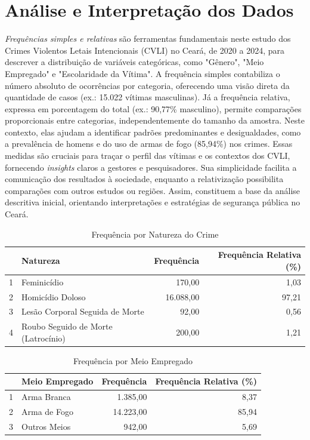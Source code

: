 \documentclass{exam}
\begin{document}
\section{Análise e Interpretação dos Dados}
\begin{questions}

\question 
\textit{Frequências simples e relativas} são ferramentas fundamentais neste estudo dos Crimes Violentos Letais Intencionais (CVLI) no Ceará, de 2020 a 2024, para descrever a distribuição de variáveis categóricas, como "Gênero", "Meio Empregado" e "Escolaridade da Vítima". A frequência simples contabiliza o número absoluto de ocorrências por categoria, oferecendo uma visão direta da quantidade de casos (ex.: 15.022 vítimas masculinas). Já a frequência relativa, expressa em porcentagem do total (ex.: 90,77\% masculino), permite comparações proporcionais entre categorias, independentemente do tamanho da amostra. Neste contexto, elas ajudam a identificar padrões predominantes e desigualdades, como a prevalência de homens e do uso de armas de fogo (85,94\%) nos crimes. Essas medidas são cruciais para traçar o perfil das vítimas e os contextos dos CVLI, fornecendo \textit{insights} claros a gestores e pesquisadores. Sua simplicidade facilita a comunicação dos resultados à sociedade, enquanto a relativização possibilita comparações com outros estudos ou regiões. Assim, constituem a base da análise descritiva inicial, orientando interpretações e estratégias de segurança pública no Ceará.

\begin{table}[H]
    \centering
    \begin{tabular}{rlrr}
        \toprule
        & \textbf{Natureza} & \textbf{Frequência} & \textbf{Frequência Relativa (\%)} \\ 
        \midrule
        1 & Feminicídio & 170,00 & 1,03 \\ 
        2 & Homicídio Doloso & 16.088,00 & 97,21 \\ 
        3 & Lesão Corporal Seguida de Morte & 92,00 & 0,56 \\ 
        4 & Roubo Seguido de Morte (Latrocínio) & 200,00 & 1,21 \\ 
        \bottomrule
    \end{tabular}
    \caption{Frequência por Natureza do Crime}
    \label{tab:freq_natureza}
\end{table}

\begin{table}[H]
    \centering
    \begin{tabular}{rlrr}
        \toprule
        & \textbf{Meio Empregado} & \textbf{Frequência} & \textbf{Frequência Relativa (\%)} \\ 
        \midrule
        1 & Arma Branca & 1.385,00 & 8,37 \\ 
        2 & Arma de Fogo & 14.223,00 & 85,94 \\ 
        3 & Outros Meios & 942,00 & 5,69 \\ 
        \bottomrule
    \end{tabular}
    \caption{Frequência por Meio Empregado}
    \label{tab:freq_meio}
\end{table}


\end{questions}
\end{document}
